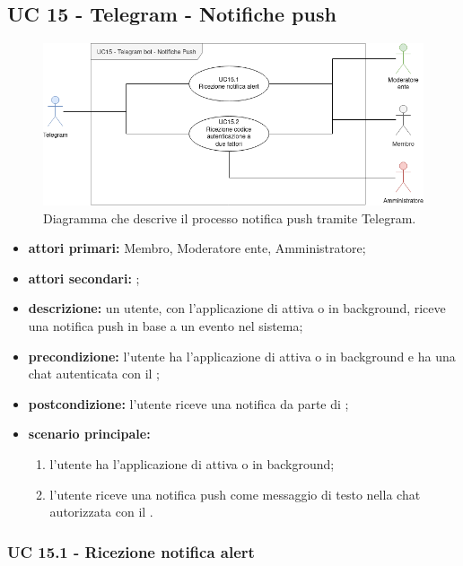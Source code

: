 \subsection{UC 15 - Telegram - Notifiche push}

	\begin{figure}[H]
		\centering
		\includegraphics[scale=0.60]{res/images/uc15}
		\caption{Diagramma che descrive il processo notifica push tramite Telegram.}
	\end{figure}
		
	\begin{itemize}
		\item \textbf{attori primari:} Membro, Moderatore ente, Amministratore;
		\item \textbf{attori secondari:} ;
		\item \textbf{descrizione:} un utente, con l'applicazione di  attiva o in background, riceve una notifica push in base a un evento nel sistema; 
		\item \textbf{precondizione:} l'utente ha l'applicazione di  attiva o in background e ha una chat autenticata con il ;
		\item \textbf{postcondizione:} l'utente riceve una notifica da parte di ;
		\item \textbf{scenario principale:}
		\begin{enumerate}
			\item l'utente ha l'applicazione di  attiva o in background; 
			\item l'utente riceve una notifica push come messaggio di testo nella chat autorizzata con il .
		\end{enumerate}
	\end{itemize}
	
	\subsubsection{UC 15.1 - Ricezione notifica alert}

